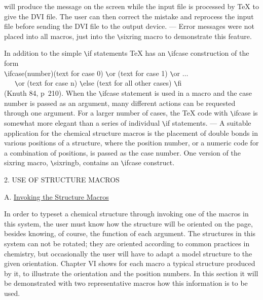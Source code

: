  will produce the message on the screen while the input
 file is processed by TeX to give the DVI file. The user
 can then correct the mistake and reprocess the input file
 before sending the DVI file to the output device. --- 
 Error messages were not placed into all macros, just into
 the \verb+\+sixring macro to demonstrate this feature.
 
 In addition to the simple \verb+\+if statements TeX has
 an \verb+\+ifcase construction of the form \\
 \indent \verb+\+ifcase(number)(text for case 0) \verb+\+or
         (text for case 1) \verb+\+or $\ldots $ \\
 \indent \ \ \ \verb+\+or (text for case n) \verb+\+else
         (text for all other cases)  \verb+\+fi  \\
 (Knuth 84, p~210). When the \verb+\+ifcase statement
 is used in a macro and the case number is passed as an
 argument, many different actions can be requested 
 through one argument. For a larger number of cases, the
 TeX code with \verb+\+ifcase is somewhat more elegant
 than a series of individual \verb+\+if statements.
 --- A suitable application for the chemical structure  
 macros is the placement of double bonds in various
 positions of a structure, where the position number,
 or a numeric code for a combination of positions,
 is passed as the case number.  One version of the
 sixring macro, \verb+\+sixringb, contains an
 \verb+\+ifcase construct.
  

 \vspace{0.4cm}
 \centerline{2. USE OF STRUCTURE MACROS}
 \vspace{0.4cm}
 \noindent A. \underline{Invoking the Structure Macros}

 In order to typeset a chemical structure through invoking one
 of the macros in this system, the user must know how the structure
 will be oriented on  the page, besides knowing, of course,
 the function of each argument. The structures in this system can
 not be rotated; they are oriented according to common practices
 in chemistry, but occasionally the user will have to adapt
 a model structure to the given orientation. Chapter VI shows
 for each macro a typical structure produced by it, to illustrate
 the orientation and the position numbers. In this section it
 will be demonstrated with two representative macros how this
 information is to be used.


